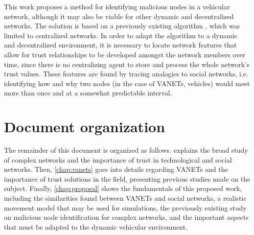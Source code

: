 %

This work proposes a method for identifying malicious nodes in a vehicular network, although it may also be viable for other dynamic and decentralized networks.
The solution is based on a previously existing algorithm \cite{vernize2015malicious}, which was limited to centralized networks.
In order to adapt the algorithm to a dynamic and decentralized environment, it is necessary to locate network features that allow for trust relationships to be developed amongst the network members over time, since there is no centralizing agent to store and process the whole network's trust values.
These features are found by tracing analogies to social networks, i.e. identifying how and why two nodes (in the case of VANETs, vehicles) would meet more than once and at a somewhat predictable interval.





\section{Document organization}
The remainder of this document is organized as follows.  explains the broad study of complex networks and the importance of trust in technological and social networks.
Then, \autoref{chap:vanets} goes into details regarding VANETs and the importance of trust solutions in the field, presenting previous studies made on the subject.
Finally, \autoref{chap:proposal} shows the fundamentals of this proposed work, including the similarities found between VANETs and social networks, a realistic movement model that may be used for simulations, the previously existing study on malicious node identification for complex networks, and the important aspects that must be adapted to the dynamic vehicular environment.